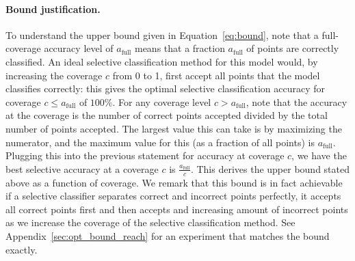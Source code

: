 \paragraph{Bound justification.} To understand the upper bound given in Equation~\ref{eq:bound}, 
note that a full-coverage accuracy level of $a_\text{full}$ means that a fraction $a_\text{full}$ of points are correctly classified. %
An ideal selective classification method for this model would, by increasing the coverage $c$ from 0 to 1, first accept all points that the model classifies correctly: this gives the optimal selective classification accuracy for coverage $c \leq a_{\text{full}}$ of $100\%$. 
For any coverage level $c > a_{\text{full}}$, note that the accuracy at the coverage is the number of correct points accepted divided by the total number of points accepted. The largest value this can take is by maximizing the numerator, and the maximum value for this (as a fraction of all points) is $a_{\text{full}}$. Plugging this into the previous statement for accuracy at coverage $c$, we have the best selective accuracy at a coverage $c$ is $\frac{a_{\text{full}}}{c}$. This derives the upper bound stated above as a function of coverage. We remark that this bound is in fact achievable if a selective classifier separates correct and incorrect points perfectly, \ie it accepts all correct points first and then accepts and increasing amount of incorrect points as we increase the coverage of the selective classification method. See Appendix~\ref{sec:opt_bound_reach} for an experiment that matches the bound exactly. 


